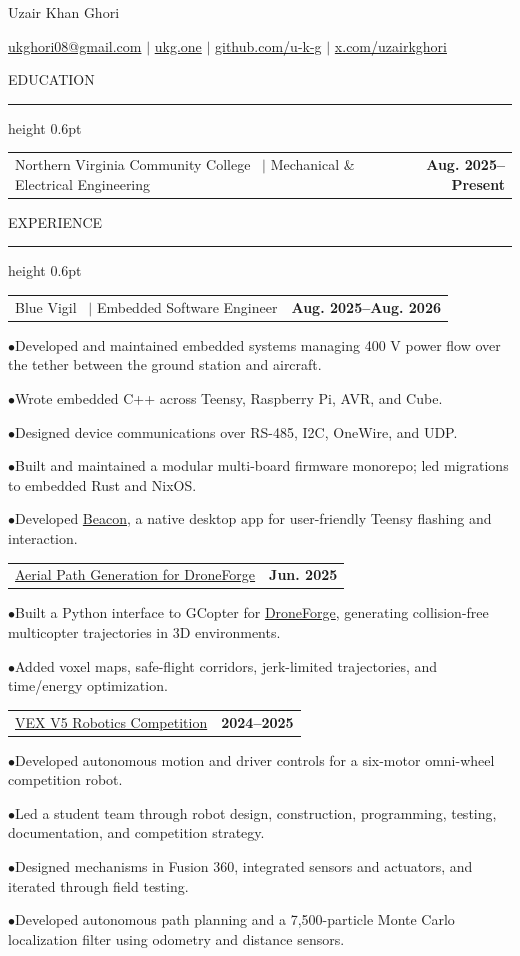 \documentclass[10pt,letterpaper]{article}
\makeatletter
\newlength{\entryindent}
\newcommand{\sectionheading}[1]{%
  \vspace{0.4em}%
  {\titlefont\color{groveAccent}\fontsize{12}{12.5}\selectfont\MakeUppercase{#1}}%
  \par\vspace{-0.05em}%
  {\color{groveBorder}\hrule height 0.6pt}%
  \vspace{0.45em}%
}
\newcommand{\entry}[3]{%
  \hspace*{\entryindent}%
  \begin{tabular*}{\dimexpr\textwidth-\entryindent\relax}{@{\extracolsep{\fill}}lr}
    {\titlefont\fontsize{11.5}{12}\selectfont #1}%
    \if\relax\detokenize{#2}\relax\else\ {\color{groveMuted}$\mid$} #2\fi & \textbf{#3}
  \end{tabular*}%
}
\newcommand{\project}[3]{%
  \hspace*{\entryindent}%
  \begin{tabular*}{\dimexpr\textwidth-\entryindent\relax}{@{\extracolsep{\fill}}lr}
    {\titlefont\fontsize{11.5}{12}\selectfont\href{#2}{#1}} & \textbf{#3}
  \end{tabular*}%
}
\newcommand{\detail}[1]{%
  \hspace*{0.12in}$\bullet$\hspace{0.08in}#1\par
}
\makeatother
\begin{document}
\pagecolor{groveCanvas}
\color{groveText}
\fontsize{10}{10.5}\selectfont

{\centering
  {\titlefont\color{groveAccent}\fontsize{25}{26}\selectfont Uzair Khan Ghori}\par
  \vspace{0.05em}
  {\fontsize{9.5}{10.5}\selectfont
    \href{mailto:ukghori08@gmail.com}{ukghori08@gmail.com}
    $\mid$ \href{https://ukg.one}{ukg.one}
    $\mid$ \href{https://github.com/u-k-g}{github.com/u-k-g}
    $\mid$ \href{https://x.com/uzairkghori}{x.com/uzairkghori}\par}
}
\vspace{0.05em}

\sectionheading{Education}

\entry{Northern Virginia Community College}{Mechanical \& Electrical Engineering}{Aug. 2025--Present}

\sectionheading{Experience}

\entry{Blue Vigil}{Embedded Software Engineer}{Aug. 2025--Aug. 2026}
\detail{Developed and maintained embedded systems managing 400 V power flow over the tether between the ground station and aircraft.}
\detail{Wrote embedded C++ across Teensy, Raspberry Pi, AVR, and Cube.}
\detail{Designed device communications over RS-485, I2C, OneWire, and UDP.}
\detail{Built and maintained a modular multi-board firmware monorepo; led migrations to embedded Rust and NixOS.}
\detail{Developed \href{https://github.com/BlueVigil/beacon}{Beacon}, a native desktop app for user-friendly Teensy flashing and interaction.}

\vspace{0.1em}
\project{Aerial Path Generation for DroneForge}{https://github.com/u-k-g/drone-pathgen}{Jun. 2025}
\detail{Built a Python interface to GCopter for \href{https://thedroneforge.com/}{DroneForge}, generating collision-free multicopter trajectories in 3D environments.}
\detail{Added voxel maps, safe-flight corridors, jerk-limited trajectories, and time/energy optimization.}

\vspace{0.1em}
\project{VEX V5 Robotics Competition}{https://github.com/u-k-g/monte-carlo-localization}{2024--2025}
\detail{Developed autonomous motion and driver controls for a six-motor omni-wheel competition robot.}
\detail{Led a student team through robot design, construction, programming, testing, documentation, and competition strategy.}
\detail{Designed mechanisms in Fusion 360, integrated sensors and actuators, and iterated through field testing.}
\detail{Developed autonomous path planning and a 7,500-particle Monte Carlo localization filter using odometry and distance sensors.}
\end{document}
